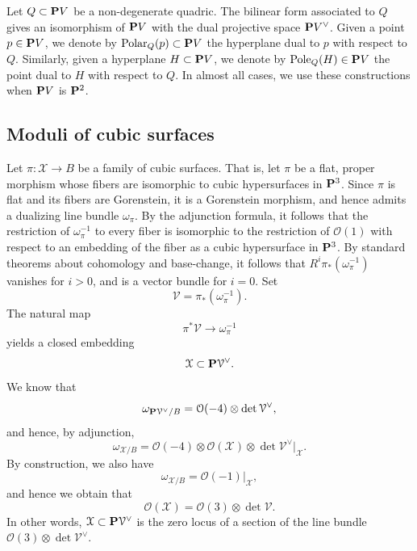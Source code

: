 \documentclass[12pt,reqno]{amsart}
\DeclareMathOperator{\Polar}{Polar}
\DeclareMathOperator{\Pole}{Pole}
\renewcommand{\to}{{\longrightarrow}}
\numberwithin{equation}{section}
\renewcommand{\O}{\mathcal O}
\newcommand{\cX}{\mathcal{X}}
\begin{document}
Let $Q \subset \P V$ be a non-degenerate quadric.  The bilinear form
associated to $Q$ gives an isomorphism of $\P V$ with the dual
projective space $\P V^\vee$.  Given a point $p \in \P V$, we denote
by $\Polar_Q(p) \subset \P V$ the hyperplane dual to $p$ with respect to
$Q$. Similarly, given a hyperplane $H \subset \P V$, we denote by
$\Pole_Q(H) \in \P V$ the point dual to $H$ with respect to $Q$.  In
almost all cases, we use these constructions when $\P V$ is $\P^2$.

\subsection{Moduli of cubic surfaces}
\label{sec:classical-facts}
Let $\pi \colon \cX \to B$ be a family of cubic surfaces.  That is,
let $\pi$ be a flat, proper morphism whose fibers are isomorphic to
cubic hypersurfaces in $\P^3$.  Since $\pi$ is flat and its fibers are
Gorenstein, it is a Gorenstein morphism, and hence admits a dualizing
line bundle $\omega_\pi$.  By the adjunction formula, it follows that
the restriction of $\omega_{\pi}^{-1}$ to every fiber is isomorphic to
the restriction of $\O(1)$ with respect to an embedding of the fiber
as a cubic hypersurface in $\P^3$.  By standard theorems about
cohomology and base-change, it follows that
$R^i\pi_* \left(\omega_{\pi}^{-1}\right)$ vanishes for $i > 0$, and is
a vector bundle for $i = 0$.  Set
\[ \mathcal V = \pi_* \left( \omega_\pi^{-1} \right).\]
The natural map 
\[ \pi^*\mathcal V \to \omega_{\pi}^{-1}\]
yields a closed embedding
\begin{equation}\label{eqn:relcanx}
  \cX \subset \P \mathcal V^\vee.
\end{equation}
We know that
\[ \omega_{\P \mathcal V^\vee/B} = \O(-4) \otimes \det \mathcal V^\vee,\]
and hence, by adjunction,
\[ \omega_{\cX/B}= \O(-4) \otimes \O(\cX) \otimes \det \mathcal V^\vee |_\cX.\]
By construction, we also have
\[ \omega_{\cX/B} = \O(-1)|_\cX,\]
and hence we obtain that
\begin{equation}\label{eqn:ox}
  \O(\cX) = \O(3) \otimes \det \mathcal V.
\end{equation}
In other words, $\cX \subset \P \mathcal V^\vee$ is the zero locus of
a section of the line bundle $\O(3) \otimes \det \mathcal V^\vee$.
\end{document}
